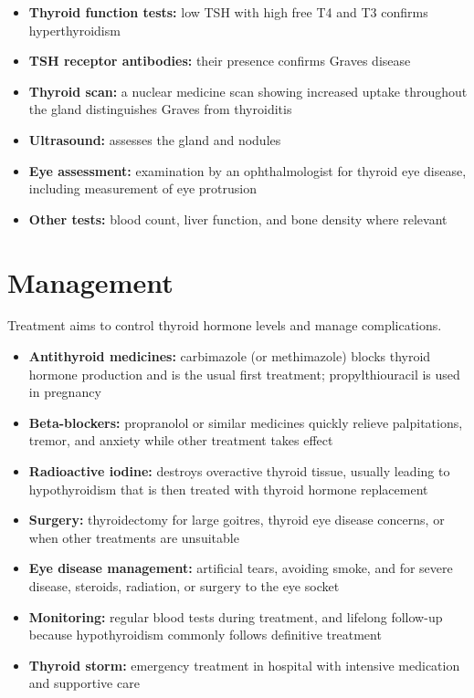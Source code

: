 \begin{itemize}
    \item \textbf{Thyroid function tests:} low TSH with high free T4 and T3 confirms hyperthyroidism
    \item \textbf{TSH receptor antibodies:} their presence confirms Graves disease
    \item \textbf{Thyroid scan:} a nuclear medicine scan showing increased uptake throughout the gland distinguishes Graves from thyroiditis
    \item \textbf{Ultrasound:} assesses the gland and nodules
    \item \textbf{Eye assessment:} examination by an ophthalmologist for thyroid eye disease, including measurement of eye protrusion
    \item \textbf{Other tests:} blood count, liver function, and bone density where relevant
\end{itemize}

\section*{Management}
Treatment aims to control thyroid hormone levels and manage complications.

\begin{itemize}
    \item \textbf{Antithyroid medicines:} carbimazole (or methimazole) blocks thyroid hormone production and is the usual first treatment; propylthiouracil is used in pregnancy
    \item \textbf{Beta-blockers:} propranolol or similar medicines quickly relieve palpitations, tremor, and anxiety while other treatment takes effect
    \item \textbf{Radioactive iodine:} destroys overactive thyroid tissue, usually leading to hypothyroidism that is then treated with thyroid hormone replacement
    \item \textbf{Surgery:} thyroidectomy for large goitres, thyroid eye disease concerns, or when other treatments are unsuitable
    \item \textbf{Eye disease management:} artificial tears, avoiding smoke, and for severe disease, steroids, radiation, or surgery to the eye socket
    \item \textbf{Monitoring:} regular blood tests during treatment, and lifelong follow-up because hypothyroidism commonly follows definitive treatment
    \item \textbf{Thyroid storm:} emergency treatment in hospital with intensive medication and supportive care
\end{itemize}

